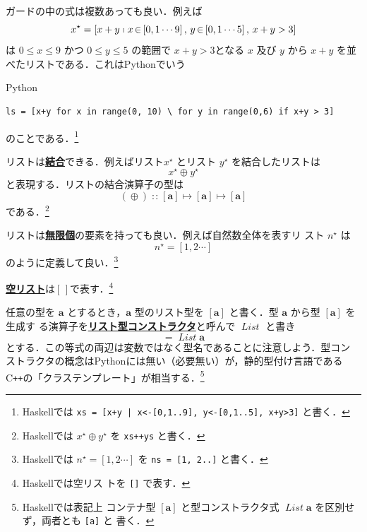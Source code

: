 \documentclass[a5paper,twoside,fleqn]{jsbook}
\newcommand{\programminglanguage}[1]{\textsf{#1}}
\newcommand{\cxx}{\programminglanguage{C}\texttt{++}}
\newcommand{\haskell}{\programminglanguage{Haskell}}
\newcommand{\python}{\programminglanguage{Python}}
\newcommand{\keyword}[1]{{\underline{\textbf{#1}}}}
\newcommand{\code}[1]{\texttt{#1}}
\newenvironment{pythoncode}{\begin{itembox}[r]{\python}}{\end{itembox}}
\newcommand{\mEmptyList}{{[\,]}}
\DeclareMathOperator{\mAppend}{\oplus}
\DeclareMathOperator{\mFrom}{\in}
\DeclareMathOperator{\mIn}{{:\!:}}
\DeclareMathOperator{\mMapsTo}{\mapsto}
\newcommand{\mType}[1]{\mathbf{#1}}
\newcommand{\mListType}[1]{[\mType{#1}]}
\newcommand{\mTypeConstructor}[1]{\textit{#1}}
\DeclareMathOperator{\mListTypeConstructor}{\mTypeConstructor{List}}
\newcommand{\mListWith}[1]{\left[#1\right]}
\newcommand{\mList}[1]{{#1}^\mathrm{\star}}
\newcommand{\mListComp}[1]{\shortmid#1}
\newcommand{\mProj}[2]{#1\mMapsTo#2}
\begin{document}
ガードの中の式は複数あっても良い．例えば
\begin{equation}
\mList{x}
=\mListWith{x+y\mListComp{x\mFrom\mListWith{0,1\dotsb9},\,y\mFrom\mListWith{0,1\dotsb5},\,x+y>3}}
\end{equation}
は $0\le x\le9$ かつ $0\le y\le5$ の範囲で $x+y>3$となる $x$ 及び $y$
から $x+y$ を並べたリストである．これは\python でいう
\begin{pythoncode}
\begin{verbatim}
ls = [x+y for x in range(0, 10) \ for y in range(0,6) if x+y > 3]
\end{verbatim}
\end{pythoncode}
のことである．\footnote{\haskell では \code{xs = [x+y | x<-[0,1..9],
      y<-[0,1..5], x+y>3]} と書く．}

リストは\keyword{結合}できる．例えばリスト$\mList{x}$ とリスト
$\mList{y}$ を結合したリストは
\begin{equation}
\mList{x}\mAppend\mList{y}
\end{equation}
と表現する．リストの結合演算子の型は
\begin{equation}
(\mAppend)\mIn{}\mProj{\mListType{a}}{\mProj{\mListType{a}}{\mListType{a}}}
\end{equation}
である．\footnote{\haskell では $\mList{x}\mAppend\mList{y}$ を
  \code{xs++ys} と書く．}

リストは\keyword{無限個}の要素を持っても良い．例えば自然数全体を表すリ
スト $\mList{n}$ は
\begin{equation}
\mList{n}=\mListWith{1,2\dotsb}
\end{equation}
のように定義して良い．\footnote{\haskell では
  $\mList{n}=\mListWith{1,2\dotsb}$ を \code{ns = [1, 2..]} と書く．}

\keyword{空リスト}は$\mEmptyList$で表す．\footnote{\haskell では空リス
  トを \code{[]} で表す．}

任意の型を $\mType{a}$ とするとき，$\mType{a}$ 型のリスト型を
$\mListType{a}$ と書く．型 $\mType{a}$ から型 $\mListType{a}$ を生成す
る演算子を\keyword{リスト型コンストラクタ}と呼んで
$\mListTypeConstructor$ と書き
\begin{equation}
\mListType{a}=\mListTypeConstructor\mType{a}
\end{equation}
とする．この等式の両辺は変数ではなく型名であることに注意しよう．型コン
ストラクタの概念は\python には無い（必要無い）が，静的型付け言語である
\cxx の「クラステンプレート」が相当する．\footnote{\haskell では表記上
  コンテナ型 $\mListType{a}$ と型コンストラクタ式
  $\mListTypeConstructor\mType{a}$ を区別せず，両者とも \code{[a]} と
  書く．}
\end{document}
